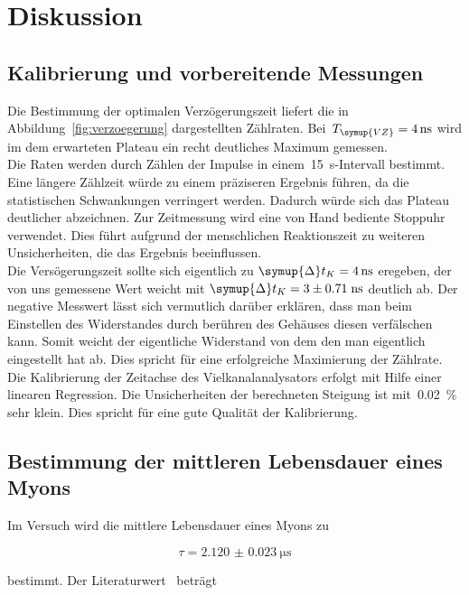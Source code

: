\section{Diskussion}
\label{sec:diskussion}

\subsection{Kalibrierung und vorbereitende Messungen}
Die Bestimmung der optimalen Verzögerungszeit liefert die in
Abbildung~\ref{fig:verzoegerung} dargestellten Zählraten.
Bei~$T_{\symup{VZ}}=\SI{4}{\nano\second}$ wird im dem erwarteten Plateau ein recht
deutliches Maximum gemessen.\\
Die Raten werden durch Zählen der Impulse in einem~\SI{15}{\second}-Intervall
bestimmt. Eine längere Zählzeit würde zu einem präziseren Ergebnis führen, da die
statistischen Schwankungen verringert werden. Dadurch würde sich das Plateau
deutlicher abzeichnen. Zur Zeitmessung wird eine von Hand bediente Stoppuhr
verwendet. Dies führt aufgrund der menschlichen Reaktionszeit zu weiteren Unsicherheiten,
die das Ergebnis beeinflussen.\\
Die Versögerungszeit sollte sich eigentlich zu $\symup{\Delta}t_K = \SI{4}{\nano\second}$ eregeben, der von uns gemessene Wert weicht mit $\symup{\Delta}t_K = \-3 \pm 0.71\; \si{\nano\second}$ deutlich ab. Der negative Messwert lässt sich vermutlich darüber erklären, dass man beim Einstellen des Widerstandes durch berühren des Gehäuses diesen verfälschen kann. Somit weicht der eigentliche Widerstand von dem den man eigentlich eingestellt hat ab. Dies spricht für eine erfolgreiche Maximierung der
Zählrate.\\
Die Kalibrierung der Zeitachse des Vielkanalanalysators erfolgt mit Hilfe einer
linearen Regression. Die Unsicherheiten der berechneten Steigung ist
mit~\SI{0.02}{\percent} sehr klein. Dies spricht für eine gute Qualität der
Kalibrierung.

\subsection{Bestimmung der mittleren Lebensdauer eines Myons}
Im Versuch wird die mittlere Lebensdauer eines Myons zu

\begin{equation}
  \tau=\SI{2.120(23)}{\micro\second}
\end{equation}

bestimmt. Der Literaturwert~\cite{pdg} beträgt

